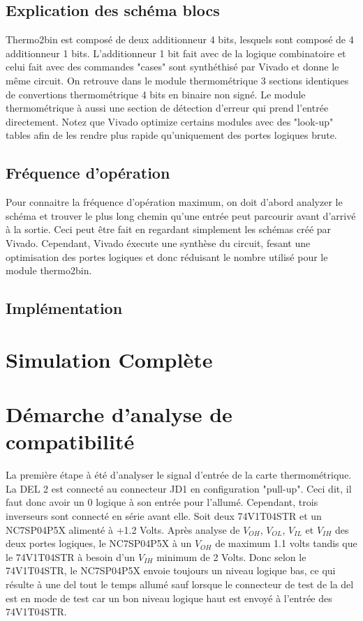 \documentclass[a11paper]{article}
\begin{document}
\subsection{Explication des schéma blocs}
Thermo2bin est composé de deux additionneur 4 bits, lesquels sont composé de 4 additionneur 1 bits. L'additionneur 1 bit fait avec de la
logique combinatoire et celui fait avec des commandes "cases" sont synthéthisé par Vivado et donne le même circuit. On retrouve dans le
module thermométrique 3 sections identiques de convertions thermométrique 4 bits en binaire non signé. Le module thermométrique à aussi
une section de détection d'erreur qui prend l'entrée directement. Notez que Vivado optimize certains modules avec des "look-up" tables
afin de les rendre plus rapide qu'uniquement des portes logiques brute.

\subsection{Fréquence d'opération}
Pour connaitre la fréquence d'opération maximum, on doit d'abord analyzer le schéma et trouver le plus long chemin qu'une entrée peut
parcourir avant d'arrivé à la sortie. Ceci peut être fait en regardant simplement les schémas créé par Vivado. Cependant, Vivado éxecute
une synthèse du circuit, fesant une optimisation des portes logiques et donc réduisant le nombre utilisé pour le module thermo2bin.

\subsection{Implémentation}

\section{Simulation Complète}

\section{Démarche d'analyse de compatibilité}
La première étape à été d'analyser le signal d'entrée de la carte thermométrique. La DEL 2 est connecté au connecteur JD1 en
configuration "pull-up". Ceci dit, il faut donc avoir un 0 logique à son entrée pour l'allumé. Cependant, trois inverseurs sont
connecté en série avant elle. Soit deux 74V1T04STR et un NC7SP04P5X alimenté à +1.2 Volts. Après analyse de $V_{OH}$, $V_{OL}$, $V_{IL}$
et $V_{IH}$ des deux portes logiques, le NC7SP04P5X à un $V_{OH}$ de maximum 1.1 volts tandis que le 74V1T04STR à besoin d'un $V_{IH}$
minimum de 2 Volts. Donc selon le 74V1T04STR, le NC7SP04P5X envoie toujours un niveau logique bas, ce qui résulte à une del
tout le temps allumé sauf lorsque le connecteur de test de la del est en mode de test car un bon niveau logique haut est envoyé à
l'entrée des 74V1T04STR.


\end{document}
